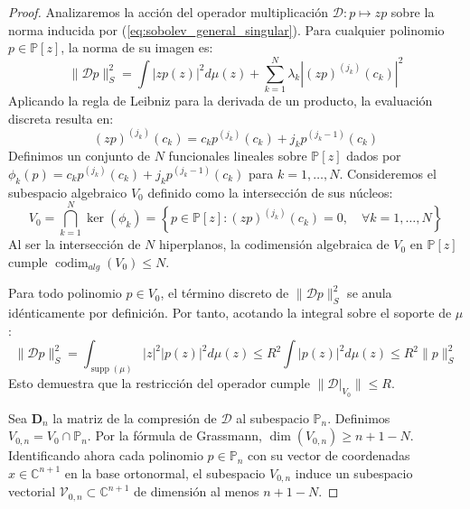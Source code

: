 \documentclass[12pt,a4paper]{article}
\theoremstyle{definition}
\theoremstyle{remark}
\begin{document}
\begin{proof}
	Analizaremos la acción del operador multiplicación $\mathcal{D}: p \mapsto zp$ sobre la norma inducida por (\ref{eq:sobolev_general_singular}). Para cualquier polinomio $p \in \mathbb{P}[z]$, la norma de su imagen es:
	\begin{equation}
		\|\mathcal{D}p\|_S^2 = \int |zp(z)|^2 d\mu(z) + \sum_{k=1}^N \lambda_k \left| (zp)^{(j_k)}(c_k) \right|^2
	\end{equation}
	Aplicando la regla de Leibniz para la derivada de un producto, la evaluación discreta resulta en:
	\begin{equation}\label{eq:leibniz_eval}
		(zp)^{(j_k)}(c_k) = c_k p^{(j_k)}(c_k) + j_k p^{(j_k-1)}(c_k)
	\end{equation}
	Definimos un conjunto de $N$ funcionales lineales sobre $\mathbb{P}[z]$ dados por $\phi_k(p) = c_k p^{(j_k)}(c_k) + j_k p^{(j_k-1)}(c_k)$ para $k=1,\dots,N$. Consideremos el subespacio algebraico $V_0$ definido como la intersección de sus núcleos:
	\begin{equation}
		V_0 = \bigcap_{k=1}^N \ker(\phi_k) = \left\{ p \in \mathbb{P}[z] : (zp)^{(j_k)}(c_k) = 0, \quad \forall k=1,\dots,N \right\}
	\end{equation}
	Al ser la intersección de $N$ hiperplanos, la codimensión algebraica de $V_0$ en $\mathbb{P}[z]$ cumple $\operatorname{codim}_{alg}(V_0) \le N$.

	Para todo polinomio $p \in V_0$, el término discreto de $\|\mathcal{D}p\|_S^2$ se anula idénticamente por definición. Por tanto, acotando la integral sobre el soporte de $\mu$:
	\begin{equation}
		\|\mathcal{D}p\|_S^2 = \int_{\operatorname{supp}(\mu)} |z|^2 |p(z)|^2 d\mu(z) \le R^2 \int |p(z)|^2 d\mu(z) \le R^2 \|p\|_S^2
	\end{equation}
	Esto demuestra que la restricción del operador cumple $\|\mathcal{D}|_{V_0}\| \le R$.

	Sea $\mathbf{D}_n$ la matriz de la compresión de $\mathcal{D}$ al subespacio $\mathbb{P}_{n}$. Definimos $V_{0,n} = V_0 \cap \mathbb{P}_{n}$. Por la fórmula de Grassmann, $\dim(V_{0,n}) \ge n+1 - N$. Identificando ahora cada polinomio $p \in \mathbb{P}_{n}$ con su vector de coordenadas $x \in \mathbb{C}^{n+1}$ en la base ortonormal, el subespacio $V_{0,n}$ induce un subespacio vectorial $\mathcal{V}_{0,n} \subset \mathbb{C}^{n+1}$ de dimensión al menos $n+1-N$.


\end{proof}
\end{document}
